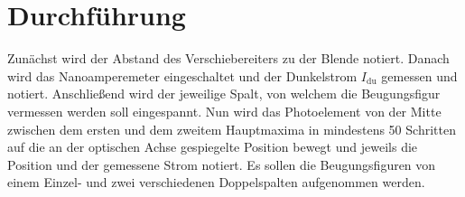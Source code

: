 
\section{Durchführung}
\label{sec:Durchführung}
Zunächst wird der Abstand des Verschiebereiters zu der Blende notiert. Danach wird das Nanoamperemeter eingeschaltet und der Dunkelstrom $I_\text{du}$ gemessen und notiert. Anschließend wird der jeweilige Spalt, von welchem die Beugungsfigur vermessen werden soll eingespannt. Nun wird das Photoelement von der Mitte zwischen dem ersten und dem zweitem Hauptmaxima in mindestens 50 Schritten auf die an der optischen Achse gespiegelte Position bewegt und jeweils die Position und der gemessene Strom notiert. Es sollen die Beugungsfiguren von einem Einzel- und zwei verschiedenen Doppelspalten aufgenommen werden.